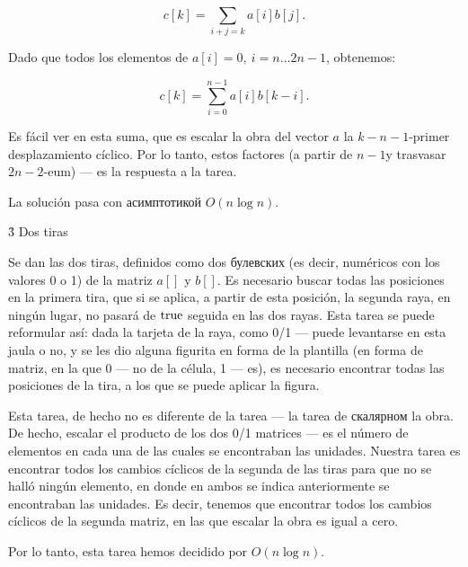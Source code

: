 $$ c[k] = \sum_{i+j=k} a[i] b[j]. $$

Dado que todos los elementos de $a[i]=0,\ i=n \ldots 2n-1$, obtenemos:

$$ c[k] = \sum_{i=0}^{n-1} a[i] b[k-i]. $$

Es fácil ver en esta suma, que es escalar la obra del vector $a$ la $k-n-1$-primer desplazamiento cíclico. Por lo tanto, estos factores (a partir de $n-1$y trasvasar $2n-2$-eum) --- es la respuesta a la tarea.

La solución pasa con асимптотикой $O (n \log n)$.


\h3{ Dos tiras }

Se dan las dos tiras, definidos como dos булевских (es decir, numéricos con los valores 0 o 1) de la matriz $a[]$ y $b[]$. Es necesario buscar todas las posiciones en la primera tira, que si se aplica, a partir de esta posición, la segunda raya, en ningún lugar, no pasará de $\rm true$ seguida en las dos rayas. Esta tarea se puede reformular así: dada la tarjeta de la raya, como 0/1 --- puede levantarse en esta jaula o no, y se les dio alguna figurita en forma de la plantilla (en forma de matriz, en la que 0 --- no de la célula, 1 --- es), es necesario encontrar todas las posiciones de la tira, a los que se puede aplicar la figura.

Esta tarea, de hecho no es diferente de la tarea --- la tarea de скалярном la obra. De hecho, escalar el producto de los dos 0/1 matrices --- es el número de elementos en cada una de las cuales se encontraban las unidades. Nuestra tarea es encontrar todos los cambios cíclicos de la segunda de las tiras para que no se halló ningún elemento, en donde en ambos se indica anteriormente se encontraban las unidades. Es decir, tenemos que encontrar todos los cambios cíclicos de la segunda matriz, en las que escalar la obra es igual a cero.

Por lo tanto, esta tarea hemos decidido por $O(n \log n)$.
